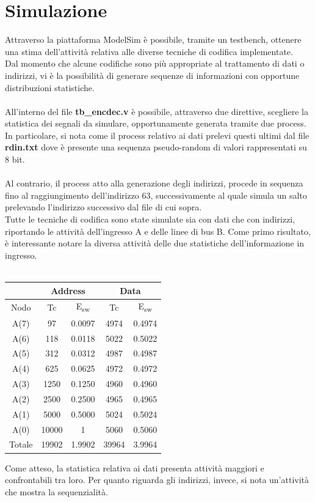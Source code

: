 \documentclass[11pt,  english, makeidx, a4paper, titlepage, oneside]{book}
\begin{document}
\section{Simulazione}
Attraverso la piattaforma ModelSim è possibile, tramite un testbench, ottenere una stima dell'attività relativa alle diverse tecniche di codifica implementate.
\\
Dal momento che alcune codifiche sono più appropriate al trattamento di dati o indirizzi, vi è la possibilità di generare sequenze di informazioni con opportune distribuzioni statistiche.
\\\\
All'interno del file \textbf{tb\_encdec.v} è possibile, attraverso due direttive, scegliere la statistica dei segnali da simulare, opportunamente generata tramite due process. In particolare, si nota come il process relativo ai dati prelevi questi ultimi dal file \textbf{rdin.txt} dove è presente una sequenza pseudo-random di valori rappresentati su 8 bit.
\\\\
Al contrario, il process atto alla generazione degli indirizzi, procede in sequenza fino al raggiungimento dell'indirizzo 63, successivamente al quale simula un salto prelevando l'indirizzo successivo dal file di cui sopra.
\\
Tutte le tecniche di codifica sono state simulate sia con dati che con indirizzi, riportando le attività dell'ingresso A e delle linee di bus B. Come primo risultato, è interessante notare la diversa attività delle due statistiche dell'informazione in ingresso.
\\\\
\begin{center}
	\begin{tabular}{|c|c|c||c|c|}
	\hline
	& \multicolumn{2}{|c||}{Address} & \multicolumn{2}{|c|}{Data}\\
	\hline
	Nodo & Tc & E\textsubscript{sw} & Tc & E\textsubscript{sw} \\
	\hline
	 A(7) & 97 & 0.0097 & 4974 & 0.4974\\
	 \hline
	A(6) & 118 & 0.0118 & 5022 & 0.5022\\
	\hline
	A(5) & 312 & 0.0312 & 4987 & 0.4987\\
	\hline
	A(4) & 625 & 0.0625 & 4972 & 0.4972\\
	\hline
	A(3) & 1250 & 0.1250 & 4960 & 0.4960\\
	\hline
	A(2) & 2500 & 0.2500 & 4965 & 0.4965\\
	\hline
	A(1) & 5000 & 0.5000 & 5024 & 0.5024\\
	\hline
	A(0) & 10000 & 1 & 5060 & 0.5060\\
	\hline
	Totale & 19902 & 1.9902 & 39964 & 3.9964\\
	\hline
	\end{tabular}	
\end{center}
\vspace{0.3cm}
Come atteso, la statistica relativa ai dati presenta attività maggiori e confrontabili tra loro. Per quanto riguarda gli indirizzi, invece, si nota un'attività che mostra la sequenzialità.
\end{document}
